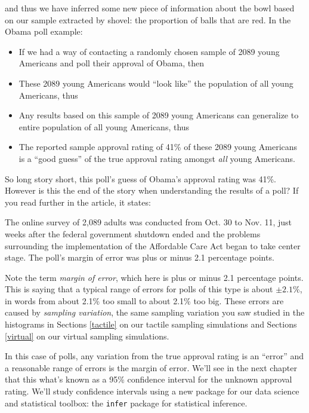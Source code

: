 \documentclass[12pt,]{krantz}
\providecommand{\tightlist}{%
  \setlength{\itemsep}{0pt}\setlength{\parskip}{0pt}}
\renewenvironment{quote}{\begin{VF}}{\end{VF}}
\theoremstyle{definition}
\theoremstyle{definition}
\theoremstyle{definition}
\theoremstyle{remark}
\begin{document}
and thus we have inferred some new piece of information about the bowl
based on our sample extracted by shovel: the proportion of balls that
are red. In the Obama poll example:

\begin{quote}
\begin{itemize}
\tightlist
\item
  If we had a way of contacting a randomly chosen sample of 2089 young
  Americans and poll their approval of Obama, then
\item
  These 2089 young Americans would ``look like'' the population of all
  young Americans, thus
\item
  Any results based on this sample of 2089 young Americans can
  generalize to entire population of all young Americans, thus
\item
  The reported sample approval rating of 41\% of these 2089 young
  Americans is a ``good guess'' of the true approval rating amongst
  \emph{all} young Americans.
\end{itemize}
\end{quote}

So long story short, this poll's guess of Obama's approval rating was
41\%. However is this the end of the story when understanding the
results of a poll? If you read further in the article, it states:

\begin{quote}
The online survey of 2,089 adults was conducted from Oct. 30 to Nov. 11,
just weeks after the federal government shutdown ended and the problems
surrounding the implementation of the Affordable Care Act began to take
center stage. The poll's margin of error was plus or minus 2.1
percentage points.
\end{quote}

Note the term \emph{margin of error}, which here is plus or minus 2.1
percentage points. This is saying that a typical range of errors for
polls of this type is about \(\pm 2.1\%\), in words from about 2.1\% too
small to about 2.1\% too big. These errors are caused by \emph{sampling
variation}, the same sampling variation you saw studied in the
histograms in Sections \ref{tactile} on our tactile sampling simulations
and Sections \ref{virtual} on our virtual sampling simulations.

In this case of polls, any variation from the true approval rating is an
``error'' and a reasonable range of errors is the margin of error. We'll
see in the next chapter that this what's known as a 95\% confidence
interval for the unknown approval rating. We'll study confidence
intervals using a new package for our data science and statistical
toolbox: the \texttt{infer} package for statistical inference.
\end{document}
